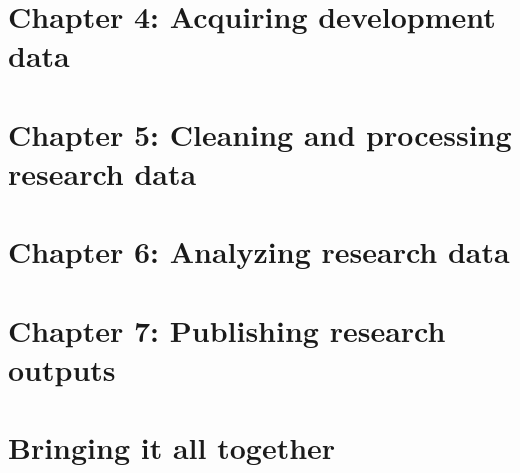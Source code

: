 




\chapter{Chapter 4: Acquiring development data}
\label{ch:4}






\chapter{Chapter 5: Cleaning and processing research data}
\label{ch:5}




\chapter{Chapter 6: Analyzing research data}
\label{ch:6}




\chapter{Chapter 7: Publishing research outputs}
\label{ch:7}




\chapter*{Bringing it all together} %

